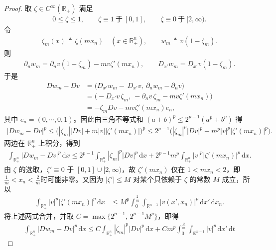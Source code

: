 \documentclass[../../main.tex]{subfiles}
\begin{document}
\begin{proof}
取 $\zeta\in C^{\infty}(\mathbb{R}_{+})$ 满足
\begin{align*}
0\leqslant \zeta\leqslant 1,\qquad
\zeta\equiv 1\ \text{于}\ [0,1],\qquad
\zeta\equiv 0\ \text{于}\ [2,\infty).
\end{align*}
令
\begin{align*}
\zeta_{m}(x)\triangleq \zeta(mx_{n})\quad (x\in\mathbb{R}^{n}_{+}),\qquad
w_{m}\triangleq v(1-\zeta_{m}).
\end{align*}
则
\begin{align*}
\partial_{n}w_{m}=\partial_{n}v(1-\zeta_{m})-mv\zeta'(mx_{n}),\qquad
D_{x'}w_{m}=D_{x'}v(1-\zeta_{m}).
\end{align*}
于是
\begin{align*}
Dw_{m}-Dv
&=\big(D_{x'}w_{m}-\ D_{x'}v,\ \partial_{n}w_{m}-\partial_{n}v\big)\\
&=\big(-D_{x'}v\,\zeta_{m},\ -\partial_{n}v\,\zeta_{m}-m v\zeta'(mx_{n})\big)\\
&=-\zeta_{m}Dv - m v\zeta'(mx_{n})e_{n},
\end{align*}
其中 $e_{n}=(0,\cdots,0,1)$。因此由三角不等式和 $(a+b)^{p}\leqslant 2^{p-1}(a^{p}+b^{p})$ 得
\begin{align*}
|Dw_{m}-Dv|^{p}
\leqslant \big(|\zeta_{m}||Dv| + m|v||\zeta'(mx_{n})|\big)^{p}\leqslant 2^{p-1}\Big(|\zeta_{m}|^{p}|Dv|^{p} + m^{p}|v|^{p}|\zeta'(mx_{n})|^{p}\Big).
\end{align*}
两边在 $\mathbb{R}^{n}_{+}$ 上积分，得到
\begin{align*}
\int_{\mathbb{R}^{n}_{+}}|Dw_{m}-Dv|^{p}\,\mathrm{d}x
\leqslant 2^{p-1}\int_{\mathbb{R}^{n}_{+}}|\zeta_{m}|^{p}|Dv|^{p}\,\mathrm{d}x + 2^{p-1}m^{p}\int_{\mathbb{R}^{n}_{+}}|v|^{p}|\zeta'(mx_{n})|^{p}\,\mathrm{d}x.
\end{align*}
由 $\zeta$ 的选取，$\zeta'\equiv 0$ 于 $[0,1]\cup[2,\infty)$，故 $\zeta'(mx_{n})$ 仅在 $1< mx_{n}<2$，即$\frac{1}{m}< x_{n}<\frac{2}{m}$时可能非零。又因为 $|\zeta'|\leqslant M$ 对某个只依赖于 $\zeta$ 的常数 $M$ 成立，所以
\begin{align*}
\int_{\mathbb{R}^{n}_{+}}|v|^{p}|\zeta'(mx_{n})|^{p}\,\mathrm{d}x
&\leqslant M^{p}\int_{0}^{\frac{2}{m}}\int_{\mathbb{R}^{n-1}}|v(x',x_{n})|^{p}\,\mathrm{d}x'\,\mathrm{d}x_{n}.
\end{align*}
将上述两式合并，并取 $C=\max\{2^{p-1},\,2^{p-1}M^{p}\}$，即得
\begin{align}\label{eq:ch05-零迹-估计AB}
\int_{\mathbb{R}^{n}_{+}}|Dw_{m}-Dv|^{p}\,\mathrm{d}x
\leqslant C\int_{\mathbb{R}^{n}_{+}}|\zeta_{m}|^{p}|Dv|^{p}\,\mathrm{d}x
+Cm^{p}\int_{0}^{\frac{2}{m}}\int_{\mathbb{R}^{n-1}}|v|^{p}\,\mathrm{d}x'\,\mathrm{d}t

\end{align}
\end{proof}
\end{document}

